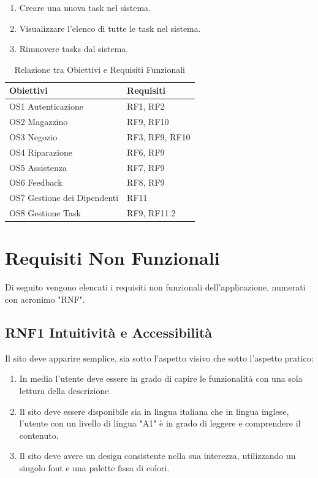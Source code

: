 \documentclass{report}
\begin{document}
\begin{enumerate}
	\item Creare una nuova task nel sistema.
	\item Visualizzare l'elenco di tutte le task nel sistema.
	\item Rimuovere tasks dal sistema.
\end{enumerate}

\begin{table}[h]
\begin{center} %
	\centering
	\begin{tabular}{ |p{4cm}|p{4cm}|  }
		\hline
		\centering Obiettivi & \qquad\qquad Requisiti \\ %
		\hline
		OS1 Autenticazione & RF1, RF2 \\
		\hline
		OS2 Magazzino & RF9, RF10 \\
		\hline
		OS3 Negozio &
		RF3, RF9, RF10 \\
		\hline
		OS4 Riparazione & RF6, RF9\\
		\hline
		OS5 Assistenza & RF7, RF9 \\
		\hline
		OS6 Feedback & RF8, RF9 \\
		\hline
		OS7 Gestione dei Dipendenti & RF11 \\
		\hline
		OS8 Gestione Task & RF9, RF11.2 \\
		\hline
	\end{tabular}
\caption{Relazione tra Obiettivi e Requisiti Funzionali}
\end{center}
\end{table}

\pagebreak


\section{Requisiti Non Funzionali}
Di seguito vengono elencati i requisiti non funzionali dell’applicazione, numerati con acronimo "RNF".

\subsection*{RNF1 Intuitività e Accessibilità}
Il sito deve apparire semplice, sia sotto l'aspetto visivo che sotto l'aspetto pratico:
\begin{enumerate}
	\item In media l’utente deve essere in grado di capire le funzionalità con una sola lettura della descrizione.
	\item Il sito deve essere disponibile sia in lingua italiana che in lingua inglese, l’utente con un livello di lingua "A1" è in grado di leggere e comprendere il contenuto.
	\item Il sito deve avere un design consistente nella sua interezza, utilizzando un singolo font e una palette fissa di colori.
\end{enumerate}
\end{document}

